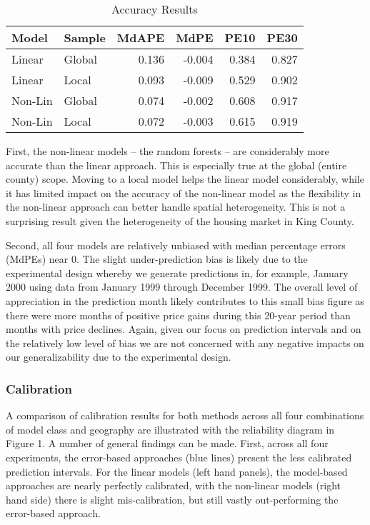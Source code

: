 \documentclass[colTwo]{anon}
\theoremstyle{definition}
\begin{document}
\begin{table}[h!]
\centering
\footnotesize
\begin{tabular}{l|l|r|r|r|r}
\hline
\textbf{Model} & \textbf{Sample} & \textbf{MdAPE} & \textbf{MdPE} & \textbf{PE10} & \textbf{PE30}\\
\hline
Linear & Global & 0.136 & -0.004 & 0.384 & 0.827\\
Linear & Local & 0.093 & -0.009 & 0.529 & 0.902\\
\hline
Non-Lin & Global & 0.074 & -0.002 & 0.608 & 0.917\\
Non-Lin & Local & 0.072 & -0.003 & 0.615 & 0.919\\
\hline
\end{tabular}
\caption{Accuracy Results}
\label{table:4}
\end{table}

First, the non-linear models -- the random forests -- are considerably more accurate than the linear approach. This is especially true at the global (entire county) scope.  Moving to a local model helps the linear model considerably, while it has limited impact on the accuracy of the non-linear model as the flexibility in the non-linear approach can better handle spatial heterogeneity.  This is not a surprising result given the heterogeneity of the housing market in King County.  

Second, all four models are relatively unbiased with median percentage errors (MdPEs) near 0.  The slight under-prediction bias is likely due to the experimental design whereby we generate predictions in, for example, January 2000 using data from January 1999 through December 1999.  The overall level of appreciation in the prediction month likely contributes to this small bias figure as there were more months of positive price gains during this 20-year period than months with price declines.  Again, given our focus on prediction intervals and on the relatively low level of bias we are not concerned with any negative impacts on our generalizability due to the experimental design. 

\subsubsection{Calibration}

A comparison of calibration results for both methods across all four combinations of model class and geography are illustrated with the reliability diagram in Figure 1.  A number of general findings can be made.  First, across all four experiments, the error-based approaches (blue lines) present the less calibrated prediction intervals.  For the linear models (left hand panels), the model-based approaches are nearly perfectly calibrated, with the non-linear models (right hand side) there is slight mis-calibration, but still vastly out-performing the error-based approach.
\end{document}
